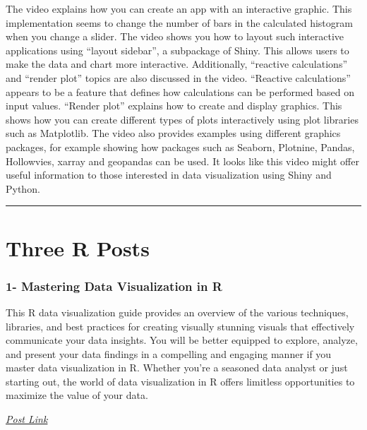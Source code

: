 \documentclass[
  letterpaper,
  DIV=11,
  numbers=noendperiod]{scrreprt}
\begin{document}
The video explains how you can create an app with an interactive
graphic. This implementation seems to change the number of bars in the
calculated histogram when you change a slider. The video shows you how
to layout such interactive applications using ``layout sidebar'', a
subpackage of Shiny. This allows users to make the data and chart more
interactive. Additionally, ``reactive calculations'' and ``render plot''
topics are also discussed in the video. ``Reactive calculations''
appears to be a feature that defines how calculations can be performed
based on input values. ``Render plot'' explains how to create and
display graphics. This shows how you can create different types of plots
interactively using plot libraries such as Matplotlib. The video also
provides examples using different graphics packages, for example showing
how packages such as Seaborn, Plotnine, Pandas, Hollowvies, xarray and
geopandas can be used. It looks like this video might offer useful
information to those interested in data visualization using Shiny and
Python.

\begin{center}\rule{0.5\linewidth}{0.5pt}\end{center}


\hypertarget{three-r-posts}{%
\chapter{\textbar{} Three R Posts}\label{three-r-posts}}

\hypertarget{mastering-data-visualization-in-r}{%
\subsection{1- Mastering Data Visualization in
R}\label{mastering-data-visualization-in-r}}

This R data visualization guide provides an overview of the various
techniques, libraries, and best practices for creating visually stunning
visuals that effectively communicate your data insights. You will be
better equipped to explore, analyze, and present your data findings in a
compelling and engaging manner if you master data visualization in R.
Whether you're a seasoned data analyst or just starting out, the world
of data visualization in R offers limitless opportunities to maximize
the value of your data.

\href{https://medium.com/@HalderNilimesh/mastering-data-visualization-in-r-a-comprehensive-guide-to-creating-stunning-visuals-and-f733564a8a41}{\emph{Post
Link}}
\end{document}
